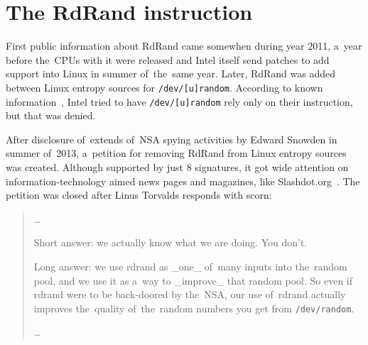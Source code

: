 \chapter{The RdRand instruction}  \label{chap:rdrand-instruction}
\par{
First public information about RdRand came somewhen during year 
2011\cite{IntelRdRandFindAbout}, a~year before the~CPUs with it were released
 and Intel itself send patches to add support into Linux in summer of~the~same 
 year\cite{KernelRdRand}. Later, RdRand was added between Linux entropy 
 sources for {\tt /dev/[u]random}. According to known 
 information~\cite{TheodoreTsoNSA}, Intel tried to have {\tt /dev/[u]random} rely
  only on their instruction, but that was denied. 
}

\par{
After disclosure of~extends of~NSA spying activities by Edward Snowden 
in summer of~2013\cite{GuardianNSA,DailymailNSA}, a~petition for removing 
RdRand from Linux entropy sources was created\cite{PetitionRdRand}. 
Although supported by just 8 signatures, it got wide attention on 
information-technology aimed news pages and magazines, like Slashdot.org~\cite{PetitionRdRandSlashdot}. The petition was closed after Linus Torvalds 
responds with scorn:
}
\begin{quote} \par{\dots}
\par{
Short answer: we actually know what we are doing. You don't.
}
\par{
Long answer: we use rdrand as \_one\_ of~many inputs into the~random pool, 
and we use it as a~way to \_improve\_ that random pool. 
So even if rdrand were to be back-doored by the~NSA, our use of~rdrand 
actually improves the~quality of~the~random numbers you get 
from {\tt /dev/random}.
}
\par{\dots}
\end{quote}

